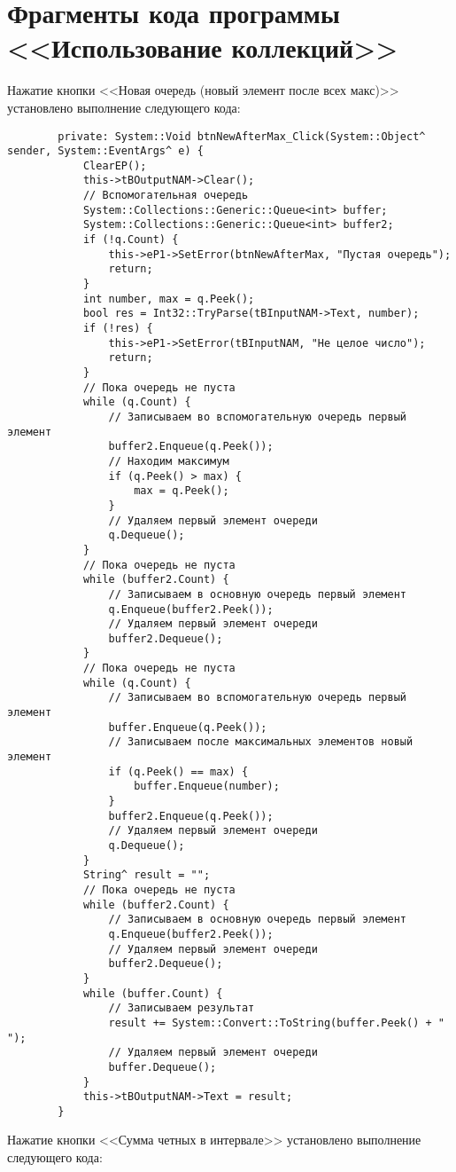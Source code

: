 \section{Фрагменты кода программы <<Использование коллекций>>}\label{app:task7}

Нажатие кнопки <<Новая очередь (новый элемент после всех макс)>> установлено выполнение следующего кода:

\begin{verbatim}
		private: System::Void btnNewAfterMax_Click(System::Object^ sender, System::EventArgs^ e) {
			ClearEP();
			this->tBOutputNAM->Clear();
			// Вспомогательная очередь
			System::Collections::Generic::Queue<int> buffer;
			System::Collections::Generic::Queue<int> buffer2;
			if (!q.Count) {
				this->eP1->SetError(btnNewAfterMax, "Пустая очередь");
				return;
			}
			int number, max = q.Peek();
			bool res = Int32::TryParse(tBInputNAM->Text, number);
			if (!res) {
				this->eP1->SetError(tBInputNAM, "Не целое число");
				return;
			}
			// Пока очередь не пуста
			while (q.Count) {
				// Записываем во вспомогательную очередь первый элемент
				buffer2.Enqueue(q.Peek());
				// Находим максимум
				if (q.Peek() > max) {
					max = q.Peek();
				}
				// Удаляем первый элемент очереди
				q.Dequeue();
			}
			// Пока очередь не пуста
			while (buffer2.Count) {
				// Записываем в основную очередь первый элемент
				q.Enqueue(buffer2.Peek());
				// Удаляем первый элемент очереди
				buffer2.Dequeue();
			}
			// Пока очередь не пуста
			while (q.Count) {
				// Записываем во вспомогательную очередь первый элемент
				buffer.Enqueue(q.Peek());
				// Записываем после максимальных элементов новый элемент
				if (q.Peek() == max) {
					buffer.Enqueue(number);
				}
				buffer2.Enqueue(q.Peek());
				// Удаляем первый элемент очереди
				q.Dequeue();
			}
			String^ result = "";
			// Пока очередь не пуста
			while (buffer2.Count) {
				// Записываем в основную очередь первый элемент
				q.Enqueue(buffer2.Peek());
				// Удаляем первый элемент очереди
				buffer2.Dequeue();
			}
			while (buffer.Count) {
				// Записываем результат
				result += System::Convert::ToString(buffer.Peek() + " ");
				// Удаляем первый элемент очереди
				buffer.Dequeue();
			}
			this->tBOutputNAM->Text = result;
		}
\end{verbatim}

Нажатие кнопки <<Сумма четных в интервале>> установлено выполнение следующего кода:

